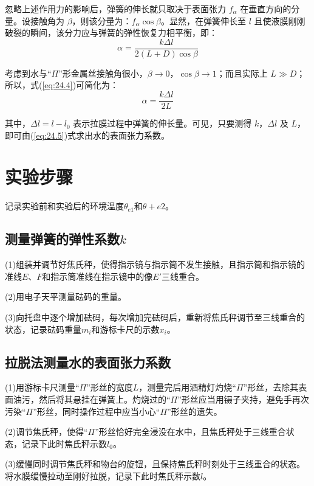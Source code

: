 \documentclass{article}
\begin{document}
忽略上述作用力的影响后，弹簧的伸长就只取决于表面张力 \(f_{\alpha}\) 在垂直方向的分量。设接触角为 \(\beta\)，则该分量为：\(f_{\alpha} \cos\beta\)。显然，在弹簧伸长至 \(l\) 且使液膜刚刚破裂的瞬间，该分力应与弹簧的弹性恢复力相平衡，即：
\begin{equation}
\alpha = \frac{k\Delta l}{2(L + D)\cos\beta} \label{eq:24.4}
\end{equation}

考虑到水与“\(\Pi\)”形金属丝接触角很小，\(\beta \to 0\)，\(\cos\beta \to 1\)；而且实际上 \(L \gg D\)；所以，式(\ref{eq:24.4})可简化为：
\begin{equation}
\alpha = \frac{k\Delta l}{2L} \label{eq:24.5}
\end{equation}

其中，\(\Delta l = l - l_0\) 表示拉膜过程中弹簧的伸长量。可见，只要测得 \(k\)，\(\Delta l\) 及 \(L\)，即可由(\ref{eq:24.5})式求出水的表面张力系数。

\section{实验步骤}
记录实验前和实验后的环境温度$\theta_{e1}$和$\theta+{e2}$。

\subsection{测量弹簧的弹性系数$k$}
(1)组装并调节好焦氏秤，使得指示镜与指示筒不发生接触，且指示筒和指示镜的准线$E、F$和指示筒准线在指示镜中的像$E'$三线重合。

(2)用电子天平测量砝码的重量。

(3)向托盘中逐个增加砝码，每次增加完砝码后，重新将焦氏秤调节至三线重合的状态，记录砝码重量$m_i$和游标卡尺的示数$x_i$。

\subsection{拉脱法测量水的表面张力系数}
(1)用游标卡尺测量“$\Pi$”形丝的宽度$L$，测量完后用酒精灯灼烧“$\Pi$”形丝，去除其表面油污，然后将其悬挂在弹簧上。灼烧过的“$\Pi$”形丝应当用镊子夹持，避免手再次污染“$\Pi$”形丝，同时操作过程中应当小心“$\Pi$”形丝的遗失。

(2)调节焦氏秤，使得“$\Pi$”形丝恰好完全浸没在水中，且焦氏秤处于三线重合状态，记录下此时焦氏秤示数$l_0$。

(3)缓慢同时调节焦氏秤和物台的旋钮，且保持焦氏秤时刻处于三线重合的状态。将水膜缓慢拉动至刚好拉脱，记录下此时焦氏秤示数$l$。
\end{document}
